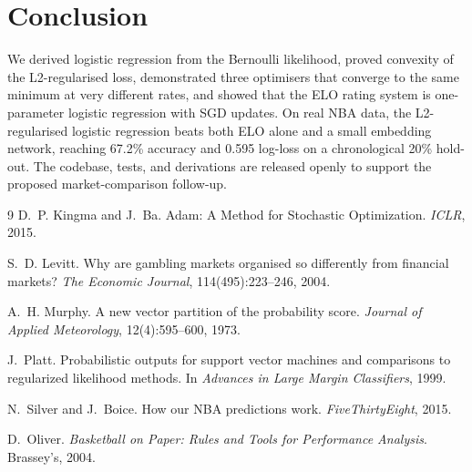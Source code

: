 \documentclass[11pt]{article}
\begin{document}
\section{Conclusion}

We derived logistic regression from the Bernoulli likelihood, proved
convexity of the L2-regularised loss, demonstrated three optimisers
that converge to the same minimum at very different rates, and showed
that the ELO rating system is one-parameter logistic regression with
SGD updates. On real NBA data, the L2-regularised logistic regression
beats both ELO alone and a small embedding network, reaching 67.2\%
accuracy and 0.595 log-loss on a chronological 20\% hold-out. The
codebase, tests, and derivations are released openly to support the
proposed market-comparison follow-up.

\begin{thebibliography}{9}
D.~P. Kingma and J.~Ba.
\newblock Adam: A Method for Stochastic Optimization.
\newblock \emph{ICLR}, 2015.

S.~D. Levitt.
\newblock Why are gambling markets organised so differently from
financial markets?
\newblock \emph{The Economic Journal}, 114(495):223--246, 2004.

A.~H. Murphy.
\newblock A new vector partition of the probability score.
\newblock \emph{Journal of Applied Meteorology}, 12(4):595--600, 1973.

J.~Platt.
\newblock Probabilistic outputs for support vector machines and
comparisons to regularized likelihood methods.
\newblock In \emph{Advances in Large Margin Classifiers}, 1999.

N.~Silver and J.~Boice.
\newblock How our NBA predictions work.
\newblock \emph{FiveThirtyEight}, 2015.

D.~Oliver.
\newblock \emph{Basketball on Paper: Rules and Tools for Performance
Analysis}.
\newblock Brassey's, 2004.
\end{thebibliography}
\end{document}
